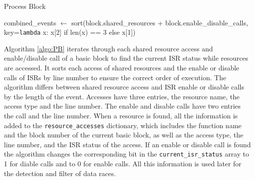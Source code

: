 \documentclass[
fancyheadings, %
%
%
]{stsreprt}
\begin{document}
{\begin{algorithm}[H]
	\caption{Process Block}
	\label{algo:PB}
	\DontPrintSemicolon
	\SetAlgoLined
	\BlankLine
	combined\_events $\gets$ sort(block.shared\_resources + block.enable\_disable\_calls, key=\texttt{lambda} x: x[2] if len(x) == 3 else x[1])\;
\end{algorithm}
\vspace{1cm}

Algorithm \ref{algo:PB} iterates through each shared resource access and enable/disable call of a basic block to find the current \ac{ISR} status while resources are accessed. It sorts each access of shared resources and the enable or disable calls of \acp{ISR} by line number to ensure the correct order of execution. The algorithm differs between shared resource access and \Ac{ISR} enable or disable calls by the length of the event. Accesses have three entries, the resource name, the access type and the line number. The enable and disable calls have two entries the call and the line number. When a resource is found, all the information is added to the \texttt{resource\_accesses} dictionary, which includes the function name and the block number of the current basic block, as well as the access type, the line number, and the \ac{ISR} status of the access. If an enable or disable call is found the algorithm changes the corresponding bit in the \texttt{current\_isr\_status} array to 1 for diable calls and to 0 for enable calls. All this information is used later for the detection and filter of data races.

}
\end{document}
